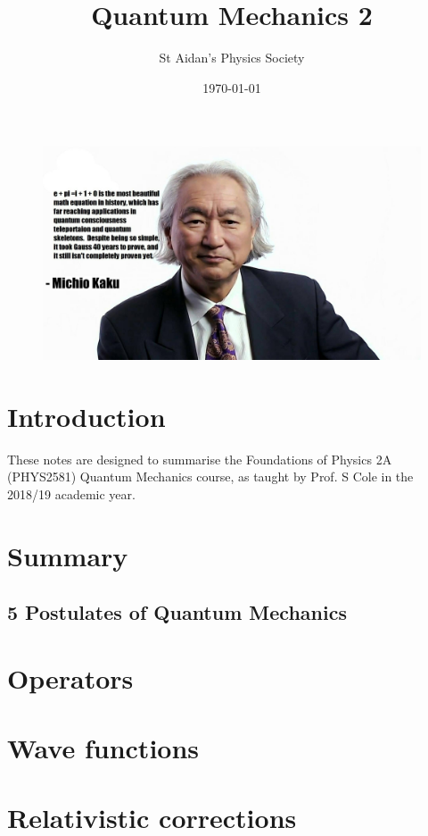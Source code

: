 \documentclass{physics_notes}
\title{Quantum Mechanics 2}
\author{St Aidan's Physics Society}
\date{\today}
\begin{document}
\maketitle
\begin{figure}[h!]
	\centering
	\includegraphics[width=\linewidth]{Figures/mich.png}
\end{figure}
\tableofcontents
\newpage

\section*{Introduction}

These notes are designed to summarise the Foundations of Physics 2A (PHYS2581) Quantum Mechanics course, as taught by Prof. S Cole in the 2018/19 academic year. 

\section*{Summary}

\subsection*{5 Postulates of Quantum Mechanics}

\section{Operators}\label{sec:operators}


\section{Wave functions}\label{sec:wave_functions}


\section{Relativistic corrections}\label{sec:relativistic_corrections}

\end{document}
